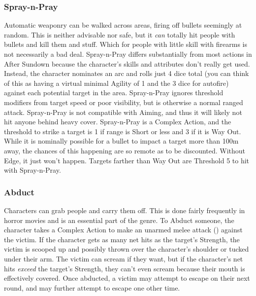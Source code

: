 \subsubsection{Spray-n-Pray}\hspace{\parindent}  Automatic weaponry can be walked across areas, firing off bullets seemingly at random. This is neither advisable nor safe, but it \textit{can} totally hit people with bullets and kill them and stuff. Which for people with little skill with firearms is not necessarily a bad deal. Spray-n-Pray differs substantially from most actions in After Sundown because the character's skills and attributes don't really get used. Instead, the character nominates an arc and rolls just 4 dice total (you can think of this as having a virtual minimal Agility of 1 and the 3 dice for autofire) against each potential target in the area. Spray-n-Pray ignores threshold modifiers from target speed or poor visibility, but is otherwise a normal ranged attack. Spray-n-Pray is not compatible with Aiming, and thus it will likely not hit anyone behind heavy cover. Spray-n-Pray is a Complex Action, and the threshold to strike a target is 1 if range is Short or less and 3 if it is Way Out. While it is nominally possible for a bullet to impact a target more than 100m away, the chances of this happening are so remote as to be discounted. Without Edge, it just won't happen. Targets farther than Way Out are Threshold 5 to hit with Spray-n-Pray.

\subsubsection{Abduct}\hspace{\parindent}  Characters can grab people and carry them off. This is done fairly frequently in horror movies and is an essential part of the genre. To Abduct someone, the character takes a Complex Action to make an unarmed melee attack () against the victim. If the character gets as many net hits as the target's Strength, the victim is scooped up and possibly thrown over the character's shoulder or tucked under their arm. The victim can scream if they want, but if the character's net hits \textit{exceed} the target's Strength, they can't even scream because their mouth is effectively covered. Once abducted, a victim may attempt to escape on their next round, and may further attempt to escape one other time.

